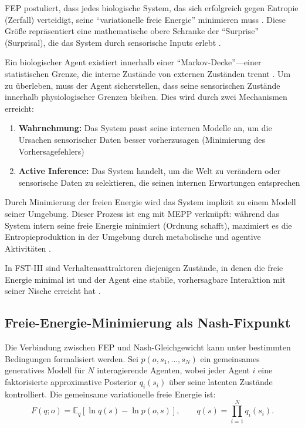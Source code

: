 \documentclass[12pt,a4paper]{article}
\theoremstyle{remark}
\begin{document}
FEP postuliert, dass jedes biologische System, das sich erfolgreich gegen Entropie (Zerfall) verteidigt, seine ``variationelle freie Energie'' minimieren muss \citep{FristonFreeEnergy}. Diese Gr\"o\ss{}e repr\"asentiert eine mathematische obere Schranke der ``Surprise'' (Surprisal), die das System durch sensorische Inputs erlebt \citep{FristonFreeEnergy}.

Ein biologischer Agent existiert innerhalb einer ``Markov-Decke''---einer statistischen Grenze, die interne Zust\"ande von externen Zust\"anden trennt \citep{FristonPDF}. Um zu \"uberleben, muss der Agent sicherstellen, dass seine sensorischen Zust\"ande innerhalb physiologischer Grenzen bleiben. Dies wird durch zwei Mechanismen erreicht:

\begin{enumerate}
    \item \textbf{Wahrnehmung:} Das System passt seine internen Modelle an, um die Ursachen sensorischer Daten besser vorherzusagen (Minimierung des Vorhersagefehlers) \citep{FristonFreeEnergy}
    \item \textbf{Active Inference:} Das System handelt, um die Welt zu ver\"andern oder sensorische Daten zu selektieren, die seinen internen Erwartungen entsprechen \citep{FristonFreeEnergy}
\end{enumerate}

Durch Minimierung der freien Energie wird das System implizit zu einem Modell seiner Umgebung. Dieser Prozess ist eng mit MEPP verkn\"upft: w\"ahrend das System intern seine freie Energie minimiert (Ordnung schafft), maximiert es die Entropieproduktion in der Umgebung durch metabolische und agentive Aktivit\"aten \citep{FristonPDF}.

In FST-III sind Verhaltensattraktoren diejenigen Zust\"ande, in denen die freie Energie minimal ist und der Agent eine stabile, vorhersagbare Interaktion mit seiner Nische erreicht hat \citep{FristonFreeEnergy}.

\subsection{Freie-Energie-Minimierung als Nash-Fixpunkt}

Die Verbindung zwischen FEP und Nash-Gleichgewicht kann unter bestimmten Bedingungen formalisiert werden. Sei $p(o,s_1,\dots,s_N)$ ein gemeinsames generatives Modell f\"ur $N$ interagierende Agenten, wobei jeder Agent $i$ eine faktorisierte approximative Posterior $q_i(s_i)$ \"uber seine latenten Zust\"ande kontrolliert. Die gemeinsame variationelle freie Energie ist:
\begin{equation}
F(q; o) = \mathbb{E}_q\!\left[\ln q(s) - \ln p(o, s)\right], \qquad q(s) = \prod_{i=1}^{N} q_i(s_i).
\end{equation}
\end{document}
